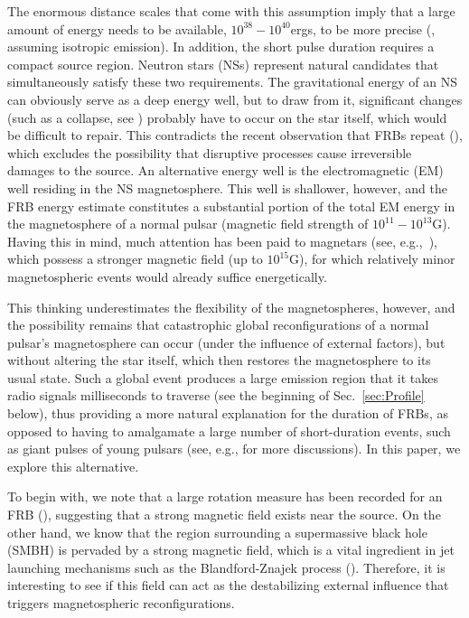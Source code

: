\documentclass{aa}
\begin{document}
The enormous distance scales that come with this assumption imply that a large amount of energy needs to be available, $10^{38}-10^{40}$ergs, to be more precise (\cite{2016MPLA...3130013K}, assuming isotropic emission). In addition, the short pulse duration requires a compact source region. Neutron stars (NSs) represent natural candidates that simultaneously satisfy these two requirements. 
The gravitational energy of an NS can obviously serve as a deep energy well, but to draw from it, significant changes (such as a collapse, see \cite{2014A&A...562A.137F}) probably have to occur on the star itself, which would be difficult to repair. This contradicts the recent observation that FRBs repeat (\cite{Spitler:2016dmz,Scholz:2016rpt}), which excludes the possibility that disruptive processes cause irreversible damages to the source. An alternative energy well is the electromagnetic (EM) well residing in the NS magnetosphere. This well is shallower, however, and the FRB energy estimate constitutes a substantial portion of the total EM energy in the magnetosphere of a normal pulsar (magnetic field strength of $10^{11}-10^{13}$G). 
Having this in mind, much attention has been paid to magnetars (see, e.g.,~\cite{2014MNRAS.442L...9L}), which possess a stronger magnetic field (up to $10^{15}$G), for which relatively minor magnetospheric events  would already suffice energetically. 

This thinking underestimates the flexibility of the magnetospheres, however, and the possibility remains that catastrophic global reconfigurations of a normal pulsar's magnetosphere can occur (under the influence of external factors), but without altering the star itself, which then restores the magnetosphere to its usual state. Such a global event produces a large emission region that it takes radio signals milliseconds to traverse (see the beginning of Sec.~\ref{sec:Profile} below), thus providing a more natural explanation for the duration of FRBs, as opposed to having to amalgamate a large number of short-duration events, such as giant pulses of young pulsars (see, e.g., \cite{2015arXiv151109137K} for more discussions). In this paper, we explore this alternative.

To begin with, we note that a large rotation measure has been recorded for an FRB (\cite{2015Natur.528..523M}), suggesting that a strong magnetic field exists near the source. On the other hand, we know that the region surrounding a supermassive black hole (SMBH) is pervaded by a strong magnetic field, which is a vital ingredient in jet launching mechanisms such as the Blandford-Znajek process (\cite{1977MNRAS.179..433B}). Therefore, it is interesting to see if this field can act as the destabilizing external influence that triggers magnetospheric reconfigurations. 
\end{document}
